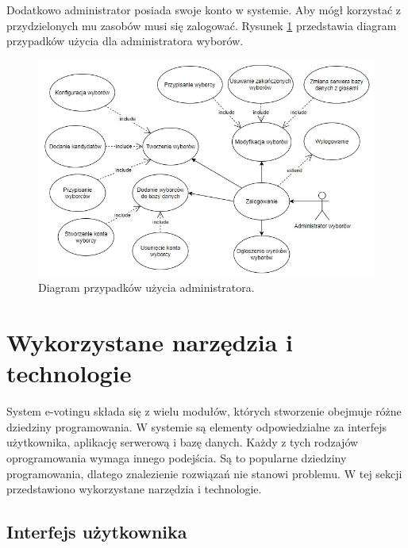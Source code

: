 \documentclass[a4paper,12pt]{book}
\begin{document}
Dodatkowo administrator posiada swoje konto w systemie. Aby mógł korzystać z przydzielonych mu zasobów musi się zalogować. Rysunek \ref{admin-use} przedstawia diagram przypadków użycia dla administratora wyborów.

\begin{figure}[h]
	\centering
	\includegraphics[width=\textwidth]{images/admin_use_case.jpg}
	\caption{Diagram przypadków użycia administratora.}\label{admin-use}
\end {figure}

\newpage
\section {Wykorzystane narzędzia i technologie}

System e-votingu składa się z wielu modułów, których stworzenie obejmuje różne dziedziny programowania. W systemie są elementy odpowiedzialne za interfejs użytkownika, aplikację serwerową i bazę danych. Każdy z tych rodzajów oprogramowania wymaga innego podejścia. Są to popularne dziedziny programowania, dlatego znalezienie rozwiązań nie stanowi problemu. W tej sekcji przedstawiono wykorzystane narzędzia i technologie.

\subsection{Interfejs użytkownika}
\end{document}
